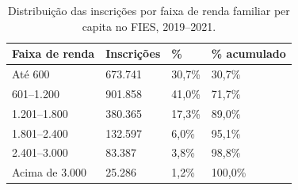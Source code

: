 \begin{table}
\caption{Distribuição das inscrições por faixa de renda familiar per capita no FIES, 2019--2021.}
\label{tab:distribuicao_faixa_renda}
\begin{tabular}{llll}
\toprule
Faixa de renda & Inscrições & \% & \% acumulado \\
\midrule
Até 600 & 673.741 & 30,7\% & 30,7\% \\
601–1.200 & 901.858 & 41,0\% & 71,7\% \\
1.201–1.800 & 380.365 & 17,3\% & 89,0\% \\
1.801–2.400 & 132.597 & 6,0\% & 95,1\% \\
2.401–3.000 & 83.387 & 3,8\% & 98,8\% \\
Acima de 3.000 & 25.286 & 1,2\% & 100,0\% \\
\bottomrule
\end{tabular}
\end{table}
